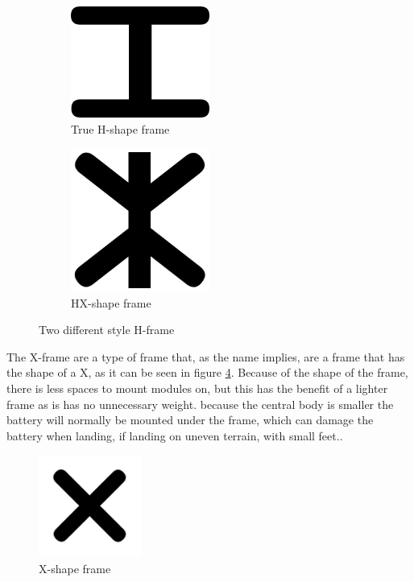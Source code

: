 \begin{figure}[h]
    \centering
    \begin{subfigure}[b]{0.49\textwidth}
        \centering
        \includegraphics[width=0.5\textwidth]{figures/PA/QCComponent/H-shape.png}
        \caption{True H-shape frame}
        \label{fig:QC_TrueH-Frame}
    \end{subfigure}
    \begin{subfigure}[b]{0.49\textwidth}
        \centering
        \includegraphics[width=0.5\textwidth]{figures/PA/QCComponent/HX-shape.png}
        \caption{HX-shape frame}
        \label{fig:QC_HXFrame}
    \end{subfigure}
    \caption{Two different style H-frame}
    \label{fig:QC_HFrame}
\end{figure}
\newline
The X-frame are a type of frame that, as the name implies, are a frame that has the shape of a X, as it can be seen in figure \ref{fig:QC_XFrame}. Because of the shape of the frame, there is less spaces to mount modules on, but this has the benefit of a lighter frame as is has no unnecessary weight. because the central body is smaller the battery will normally be mounted under the frame, which can damage the battery when landing, if landing on uneven terrain, with small feet.\cite{FPVFrame}.
\begin{figure}[h]
    \centering
    \includegraphics[width=0.3\textwidth]{figures/PA/QCComponent/X-shape_frame.png}
    \caption{X-shape frame}
    \label{fig:QC_XFrame}
\end{figure}
%
%

